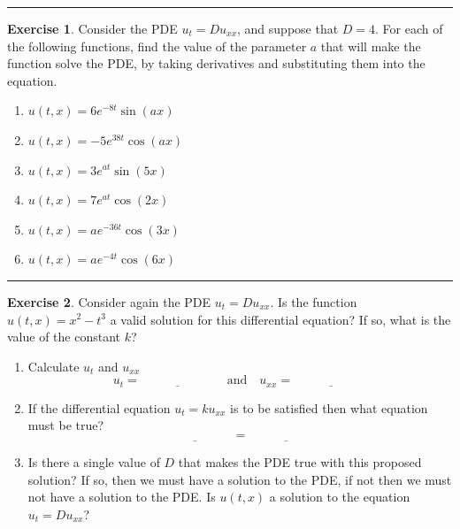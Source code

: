 \documentclass[
]{book}
\providecommand{\tightlist}{%
  \setlength{\itemsep}{0pt}\setlength{\parskip}{0pt}}
\theoremstyle{definition}
\theoremstyle{definition}
\theoremstyle{definition}
\newtheorem{exercise}{Exercise}[chapter]
\theoremstyle{remark}
\begin{document}
\begin{center}\rule{0.5\linewidth}{0.5pt}\end{center}

\begin{exercise}
\protect\hypertarget{exr:unnamed-chunk-512}{}{\label{exr:unnamed-chunk-512} }Consider the PDE \(u_t = D u_{xx}\), and suppose that \(D=4\). For each of the following functions, find the value of the parameter \(a\) that will make the function solve the PDE, by taking derivatives and substituting them into the equation.

\begin{enumerate}
\def\labelenumi{\alph{enumi}.}
\tightlist
\item
  \(u(t,x) = 6 e^{-8 t} \sin(ax)\)
\item
  \(u(t,x) = -5 e^{38 t} \cos(ax)\)
\item
  \(u(t,x) = 3 e^{at} \sin(5 x)\)
\item
  \(u(t,x) = 7 e^{at} \cos(2 x)\)
\item
  \(u(t,x) = a e^{-36t} \cos(3 x)\)
\item
  \(u(t,x) = a e^{-4t} \cos(6 x)\)
\end{enumerate}
\end{exercise}

\begin{center}\rule{0.5\linewidth}{0.5pt}\end{center}

\begin{exercise}
\protect\hypertarget{exr:unnamed-chunk-513}{}{\label{exr:unnamed-chunk-513} }Consider again the PDE \(u_t = D u_{xx}\). Is the function \(u(t,x) = x^2 - t^3\) a valid solution for this differential equation? If so, what is the value of the constant \(k\)?

\begin{enumerate}
\def\labelenumi{\alph{enumi}.}
\tightlist
\item
  Calculate \(u_t\) and \(u_{xx}\)
  \[ u_t = \underline{\hspace{1in}} \quad \text{and} \quad u_{xx} = \underline{\hspace{1in}} \]
\item
  If the differential equation \(u_t = ku_{xx}\) is to be satisfied then what equation must be true?
  \[ \underline{\hspace{1in}} = \underline{\hspace{1in}} \]
\item
  Is there a single value of \(D\) that makes the PDE true with this proposed solution? If so, then we must have a solution to the PDE, if not then we must not have a solution to the PDE. Is \(u(t,x)\) a solution to the equation \(u_t = Du_{xx}\)?
\end{enumerate}
\end{exercise}
\end{document}

